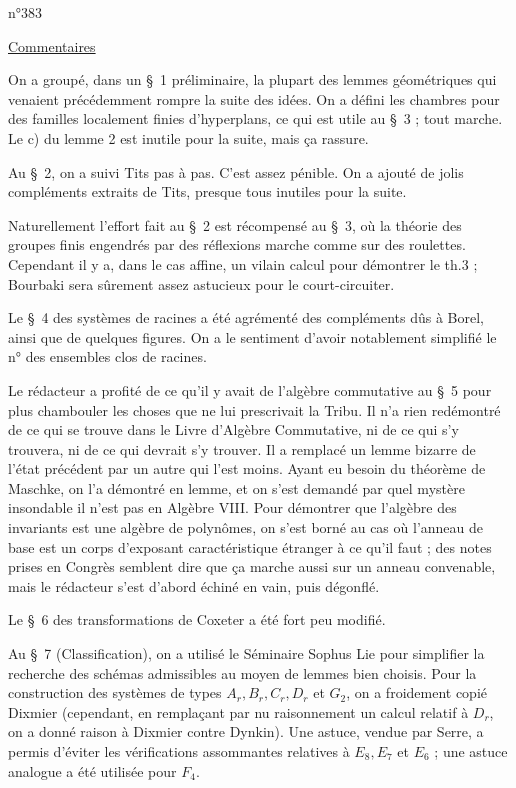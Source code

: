 \hfill n°383

\begin{center}\uline{Commentaires}\end{center}

On a groupé, dans un \S~1 préliminaire, la plupart des lemmes géométriques qui venaient précédemment rompre la suite des idées. On a défini les chambres pour des familles localement finies d'hyperplans, ce qui est utile au \S~3 ; tout marche. Le c) du lemme 2 est inutile pour la suite, mais ça rassure.

Au \S~2, on a suivi Tits pas à pas. C'est assez pénible. On a ajouté de jolis compléments extraits de Tits, presque tous inutiles pour la suite.

Naturellement l'effort fait au \S~2 est récompensé au \S~3, où la théorie des groupes finis engendrés par des réflexions marche comme sur des roulettes. Cependant il y a, dans le cas affine, un vilain calcul pour démontrer le th.3 ; Bourbaki sera sûrement assez astucieux pour le court-circuiter.

Le \S~4 des systèmes de racines a été agrémenté des compléments dûs à Borel, ainsi que de quelques figures. On a le sentiment d'avoir notablement simplifié le n° des ensembles clos de racines.

Le rédacteur a profité de ce qu'il y avait de l'algèbre commutative au \S~5 pour plus chambouler les choses que ne lui prescrivait la Tribu. Il n'a rien redémontré de ce qui se trouve dans le Livre d'Algèbre Commutative, ni de ce qui s'y trouvera, ni de ce qui devrait s'y trouver. Il a remplacé un lemme bizarre de l'état précédent par un autre qui l'est moins. Ayant eu besoin du théorème de Maschke, on l'a démontré en lemme, et on s'est demandé par quel mystère insondable il n'est pas en Algèbre VIII. Pour démontrer que l'algèbre des invariants est une algèbre de polynômes, on s'est borné au cas où l'anneau de base est un corps d'exposant caractéristique étranger à ce qu'il faut ; des notes prises en Congrès semblent dire que ça marche aussi sur un anneau convenable, mais le rédacteur s'est d'abord échiné en vain, puis dégonflé.

Le \S~6 des transformations de Coxeter a été fort peu modifié.

Au \S~7 (Classification), on a utilisé le Séminaire Sophus Lie pour simplifier la recherche des schémas admissibles au moyen de lemmes bien choisis. Pour la construction des systèmes de types $A_r,B_r,C_r,D_r$ et $G_2$, on a froidement copié Dixmier (cependant, en remplaçant par nu raisonnement un calcul relatif à $D_r$, on a donné raison à Dixmier contre Dynkin). Une astuce, vendue par Serre, a permis d'éviter les vérifications assommantes relatives à $E_{8},E_{7}$ et $E_{6}$ ; une astuce analogue a été utilisée pour $F_{4}$.

